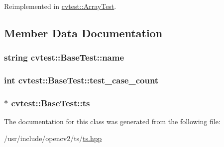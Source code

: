 Reimplemented in \hyperlink{classcvtest_1_1ArrayTest_ad8a2e0184f77ca42ed3b3aa7229c217e}{cvtest\-::\-Array\-Test}.



\subsection{Member Data Documentation}
\hypertarget{classcvtest_1_1BaseTest_aa5dd881caa5023490a723976fe9bcdd8}{
\subsubsection[{name}]{\setlength{\rightskip}{0pt plus 5cm}string cvtest\-::\-Base\-Test\-::name\hspace{0.3cm}{\ttfamily [protected]}}}\label{classcvtest_1_1BaseTest_aa5dd881caa5023490a723976fe9bcdd8}
\hypertarget{classcvtest_1_1BaseTest_a20ef42b44b55838ddb61c399c9c8407b}{
\subsubsection[{test\-\_\-case\-\_\-count}]{\setlength{\rightskip}{0pt plus 5cm}int cvtest\-::\-Base\-Test\-::test\-\_\-case\-\_\-count\hspace{0.3cm}{\ttfamily [protected]}}}\label{classcvtest_1_1BaseTest_a20ef42b44b55838ddb61c399c9c8407b}
\hypertarget{classcvtest_1_1BaseTest_ab30930fd0e1878ddc54f335410eef7e5}{
\subsubsection[{ts}]{$\ast$ cvtest\-::\-Base\-Test\-::ts\hspace{0.3cm}{\ttfamily [protected]}}}\label{classcvtest_1_1BaseTest_ab30930fd0e1878ddc54f335410eef7e5}


The documentation for this class was generated from the following file\-:\begin{DoxyCompactItemize}
\item 
/usr/include/opencv2/ts/\hyperlink{ts_8hpp}{ts.\-hpp}\end{DoxyCompactItemize}
